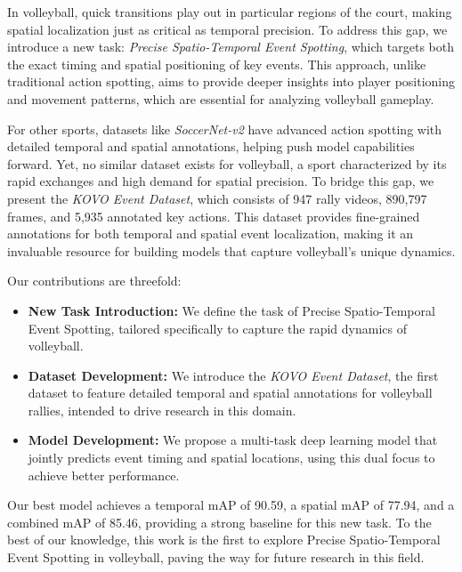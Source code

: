\documentclass[conference]{IEEEtran}
\begin{document}
In volleyball, quick transitions play out in particular regions of the court, making spatial localization just as critical as temporal precision. To address this gap, we introduce a new task: \textit{Precise Spatio-Temporal Event Spotting}, which targets both the exact timing and spatial positioning of key events. This approach, unlike traditional action spotting, aims to provide deeper insights into player positioning and movement patterns, which are essential for analyzing volleyball gameplay.

For other sports, datasets like \textit{SoccerNet-v2} \cite{soccernetv2} have advanced action spotting with detailed temporal and spatial annotations, helping push model capabilities forward. Yet, no similar dataset exists for volleyball, a sport characterized by its rapid exchanges and high demand for spatial precision. To bridge this gap, we present the \textit{KOVO Event Dataset}, which consists of 947 rally videos, 890,797 frames, and 5,935 annotated key actions. This dataset provides fine-grained annotations for both temporal and spatial event localization, making it an invaluable resource for building models that capture volleyball's unique dynamics.

Our contributions are threefold:
\begin{itemize}
    \item \textbf{New Task Introduction:} We define the task of Precise Spatio-Temporal Event Spotting, tailored specifically to capture the rapid dynamics of volleyball.
    \item \textbf{Dataset Development:} We introduce the \textit{KOVO Event Dataset}, the first dataset to feature detailed temporal and spatial annotations for volleyball rallies, intended to drive research in this domain.
    \item \textbf{Model Development:} We propose a multi-task deep learning model that jointly predicts event timing and spatial locations, using this dual focus to achieve better performance.
\end{itemize}

Our best model achieves a temporal mAP of 90.59, a spatial mAP of 77.94, and a combined mAP of 85.46, providing a strong baseline for this new task. To the best of our knowledge, this work is the first to explore Precise Spatio-Temporal Event Spotting in volleyball, paving the way for future research in this field.
\end{document}

